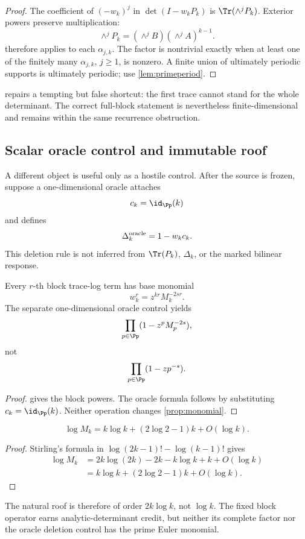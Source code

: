 \begin{proof}
The coefficient of \((-w_k)^j\) in
\(\det(I-w_kP_k)\) is
\(\Tr(\wedge^jP_k)\).  Exterior powers preserve multiplication:
\[
 \wedge^jP_k
 =(\wedge^jB)(\wedge^jA)^{k-1}.
\]
 therefore applies to each
\(\alpha_{j,k}\).  The factor is nontrivial exactly when at least one of the
finitely many \(\alpha_{j,k}\), \(j\ge1\), is nonzero.  A finite union of
ultimately periodic supports is ultimately periodic; use
\cref{lem:primeperiod}.
\end{proof}

 repairs a tempting but false shortcut: the first
trace cannot stand for the whole determinant.  The correct full-block
statement is nevertheless finite-dimensional and remains within the same
recurrence obstruction.

\subsection{Scalar oracle control and immutable roof}

A different object is useful only as a hostile control.  After the source
is frozen, suppose a one-dimensional oracle attaches
\[
        c_k=\id_{\Pp}(k)
\]
and defines
\[
        \Delta_k^{\rm oracle}=1-w_kc_k.
\]
This deletion rule is not inferred from
\(\Tr(P_k)\), \(\Delta_k\), or the marked bilinear response.

\begin{theorem}
\label{thm:factorial}
Every \(r\)-th block trace-log term has base monomial
\[
        w_k^r=z^{kr}M_k^{-2sr}.
\]
The separate one-dimensional oracle control yields
\[
 \prod_{p\in\Pp}(1-z^pM_p^{-2s}),
\]
not
\[
 \prod_{p\in\Pp}(1-zp^{-s}).
\]
\end{theorem}

\begin{proof}
 gives the block powers.  The oracle formula follows
by substituting \(c_k=\id_{\Pp}(k)\).  Neither operation changes
\cref{prop:monomial}.
\end{proof}

\begin{proposition}
\label{prop:stirling}
\[
        \log M_k
        =k\log k+(2\log2-1)k+O(\log k).
\]
\end{proposition}

\begin{proof}
Stirling's formula in
\(\log(2k-1)!-\log(k-1)!\) gives
\[
\begin{aligned}
\log M_k
 &=2k\log(2k)-2k-k\log k+k+O(\log k)\\
 &=k\log k+(2\log2-1)k+O(\log k).
\end{aligned}
\]
\end{proof}

The natural roof is therefore of order \(2k\log k\), not \(\log k\).
The fixed block operator earns analytic-determinant credit, but neither its
complete factor nor the oracle deletion control has the prime Euler
monomial.
